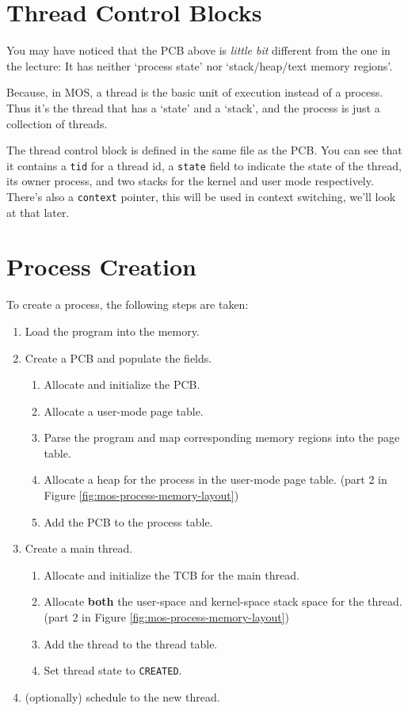 \section{Thread Control Blocks}

You may have noticed that the PCB above is \textit{little bit} different from the one in the
lecture: It has neither `process state' nor `stack/heap/text memory regions'.

Because, in MOS, a thread is the basic unit of execution instead of a process. Thus it's the thread that has a
`state' and a `stack', and the process is just a collection of threads.

The thread control block is defined in the same file as the PCB. You can see that it contains
a \texttt{tid} for a thread id, a \texttt{state} field to indicate the state of the thread,
its owner process, and two stacks for the kernel and user mode respectively. There's also a
\texttt{context} pointer, this will be used in context switching, we'll look at that later.

\section{Process Creation}

To create a process, the following steps are taken:

\begin{enumerate}
    \item Load the program into the memory.
    \item Create a PCB and populate the fields.
          \begin{enumerate}
              \item Allocate and initialize the PCB.
              \item Allocate a user-mode page table.
              \item Parse the program and map corresponding memory regions into the page table.
              \item Allocate a heap for the process in the user-mode page table.
                    (part 2 in Figure \ref{fig:mos-process-memory-layout})
              \item Add the PCB to the process table.
          \end{enumerate}
    \item Create a main thread.
          \begin{enumerate}
              \item Allocate and initialize the TCB for the main thread.
              \item Allocate \textbf{both} the user-space and kernel-space stack space for the thread.
                    (part 2 in Figure \ref{fig:mos-process-memory-layout})
              \item Add the thread to the thread table.
              \item Set thread state to \texttt{CREATED}.
          \end{enumerate}
    \item (optionally) schedule to the new thread.
\end{enumerate}

